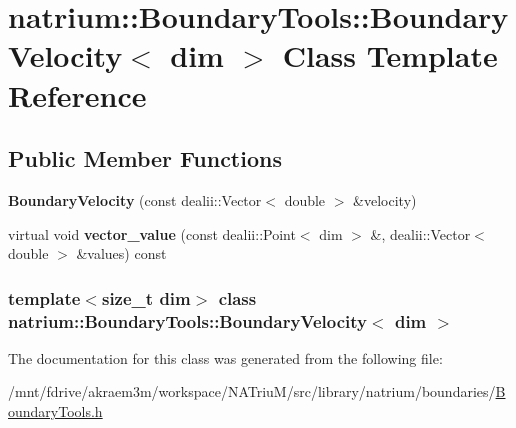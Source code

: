 \hypertarget{classnatrium_1_1BoundaryTools_1_1BoundaryVelocity}{
\section{natrium::BoundaryTools::BoundaryVelocity$<$ dim $>$ Class Template Reference}
\label{classnatrium_1_1BoundaryTools_1_1BoundaryVelocity}
}
\subsection*{Public Member Functions}
\begin{DoxyCompactItemize}
\item 
\hypertarget{classnatrium_1_1BoundaryTools_1_1BoundaryVelocity_a0eb88d154f721f580d113ff7991a6390}{
{\bfseries BoundaryVelocity} (const dealii::Vector$<$ double $>$ \&velocity)}
\label{classnatrium_1_1BoundaryTools_1_1BoundaryVelocity_a0eb88d154f721f580d113ff7991a6390}

\item 
\hypertarget{classnatrium_1_1BoundaryTools_1_1BoundaryVelocity_a33ffa27bf73b9749af366b9a08631905}{
virtual void {\bfseries vector\_\-value} (const dealii::Point$<$ dim $>$ \&, dealii::Vector$<$ double $>$ \&values) const }
\label{classnatrium_1_1BoundaryTools_1_1BoundaryVelocity_a33ffa27bf73b9749af366b9a08631905}

\end{DoxyCompactItemize}
\subsubsection*{template$<$size\_\-t dim$>$ class natrium::BoundaryTools::BoundaryVelocity$<$ dim $>$}



The documentation for this class was generated from the following file:\begin{DoxyCompactItemize}
\item 
/mnt/fdrive/akraem3m/workspace/NATriuM/src/library/natrium/boundaries/\hyperlink{BoundaryTools_8h}{BoundaryTools.h}\end{DoxyCompactItemize}
